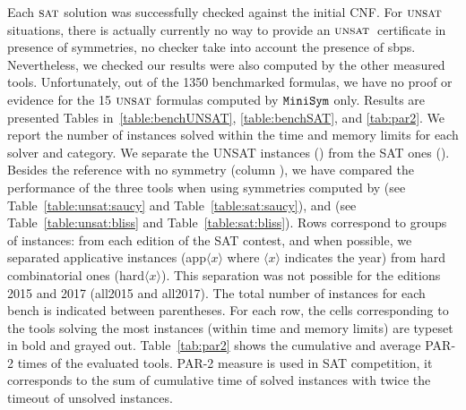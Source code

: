 Each $\textsc{sat}$ solution was successfully checked against the initial CNF. For $\textsc{unsat}$
situations, there is actually currently no way to provide an $\textsc{unsat}\,$ certificate in presence of
symmetries, no checker take into account the presence of sbps. Nevertheless, we checked our results were also computed by the
other measured tools. Unfortunately, out of the 1350 benchmarked formulas, we
have no proof or evidence for the 15 $\textsc{unsat}$ formulas computed by $\texttt{MiniSym}{}$
only.
Results are presented Tables in~\ref{table:benchUNSAT}, \ref{table:benchSAT},
and \ref{tab:par2}. We report the number of instances solved within the time
and memory limits for each solver and category. We separate the UNSAT instances
() from the SAT ones (). Besides
the reference with no symmetry (column \minisat{}), we have compared the
performance of the three tools when using symmetries computed by \saucy{} (see
Table~\ref{table:unsat:saucy} and Table~\ref{table:sat:saucy}), and \bliss{}
(see Table~\ref{table:unsat:bliss} and Table~\ref{table:sat:bliss}). Rows
correspond to groups of instances: from each edition of the SAT contest, and
when possible, we separated applicative instances (app$\langle x \rangle$ where
$\langle x \rangle$ indicates the year) from hard combinatorial ones
(hard$\langle x \rangle$). This separation was not possible for the editions
2015 and 2017 (all2015 and all2017). The total number of instances for each
bench is indicated between parentheses. For each row, the cells corresponding
to the tools solving the most instances (within time and memory limits) are
typeset in bold and grayed out. Table~\ref{tab:par2} shows the cumulative and
average PAR-2 times of the evaluated tools. PAR-2 measure is used in SAT competition,
it corresponds to the sum of cumulative time of solved instances with twice the
timeout of unsolved instances.
 
 \clearpage
 

